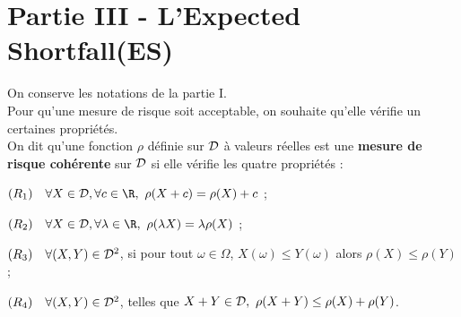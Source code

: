 \documentclass[11pt]{article}%
\begin{document}
\section*{Partie III - L'\og Expected Shortfall\fg (ES)}
\noindent
On conserve les notations de la partie I.\\
Pour qu'une mesure de risque soit acceptable, on souhaite qu'elle 
vérifie un certaines propriétés.\\
On dit qu'une fonction $\rho$ définie sur ${\cal D}$ à valeurs 
réelles est une {\bf mesure de risque cohérente} sur ${\cal D}$ 
si elle vérifie les quatre propriétés :
\begin{noliste}{}
  \item $(R_1) \quad \forall X \in {\cal D}, \forall c \in \R, \
  \rho(X+c)=\rho(X)+c$ ;
  
  \item $(R_2) \quad \forall X \in {\cal D}, \forall \lambda \in 
  \R, \ \rho(\lambda X)=\lambda \rho(X)$ ;
  
  \item $(R_3) \quad \forall(X,Y) \in {\cal D}^2$, si pour tout 
  $\omega \in \Omega$, $X(\omega) \leq Y(\omega)$ alors $\rho(X) 
  \leq \rho(Y)$ ;
  
  \item $(R_4) \quad \forall(X,Y) \in {\cal D}^2$, telles que $X+Y 
  \in {\cal D}, \ \rho(X+Y) \leq \rho(X)+\rho(Y)$.
\end{noliste}
\end{document}

